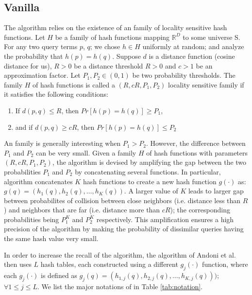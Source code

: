\subsection{Vanilla \lsh}
\label{sec:vlsh}
The \lsh algorithm relies on the existence of an family of locality sensitive hash functions. 
Let $H$ be a family of hash functions mapping 
 $\mathbb{R}^D$ to some universe S. For any two query terms $p$, $q$; we chose $h\in H$ uniformly at random; 
 and analyze the probability that $h(p) = h(q)$.  
 Suppose $d$ is a distance function (cosine distance for us), 
$R > 0$ be a distance threshold $R>0$ and $c>1$ be an approximation factor.   
Let $P_1, P_2 \in (0, 1)$ be two probability thresholds.  
The family $H$ of hash functions is called a $(R, cR, P_1, P_2)$ locality sensitive family if 
 it satisfies the following conditions:
\begin{enumerate}
\item If $d(p,q) \leq R$, then $Pr[h(p)=h(q)] \geq P_1$, 
\item and if $d(p,q) \geq cR$, then $Pr[h(p)=h(q)] \leq P_2$
\end{enumerate}
An \lsh family is generally interesting when  $P_1>P_2$. 
However, the difference between $P_1$ and $P_2$ can be very small. 
Given a family $H$ of hash functions with parameters $(R, cR, P_1,P_2)$, 
the \lsh algorithm is devised by amplifying the gap between 
the two probabilities $P_1$ and $P_2$ by concatenating several functions. 
In particular, \lsh algorithm concatenates $K$ hash functions
to create a new hash function $g(\cdot)$ as:
$g(q)=(h_1(q),h_2(q),\dots,h_K(q))$. 
A larger value of $K$ leads to larger 
gap between probabilites of collision between close neighbors (i.e. distance less than $R$) and neighbors that are far (i.e. 
distance more than $cR$); 
the corresponding probabilities being $P_1^{K}$ and $P_2^{K}$ respectively. 
This amplification ensures a high precision of the algorithm by  
making the probability of dissimilar queries having the same hash value very small.

In order to increase the recall of the \lsh algorithm, the algorithm of Andoni et al. then uses
$L$ hash tables, each constructed using a different $g_j(\cdot)$ function, where each 
$g_j(\cdot)$ is defined as $g_j(q)=(h_{1,j}(q),h_{2,j}(q),\dots,h_{K,j}(q)))$; $\forall 1 \leq j \leq  L$. 
We list the major notations of \lsh in Table \ref{tab:notation}. 


